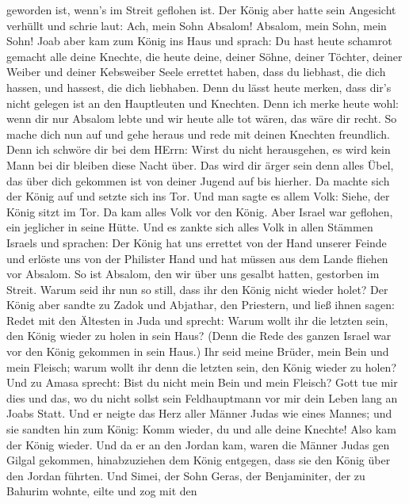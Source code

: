 geworden ist, wenn's im Streit geflohen ist.  Der König aber
hatte sein Angesicht verhüllt und schrie laut: Ach, mein Sohn Absalom!
Absalom, mein Sohn, mein Sohn!  Joab aber kam zum König ins
Haus und sprach: Du hast heute schamrot gemacht alle deine Knechte, die
heute deine, deiner Söhne, deiner Töchter, deiner Weiber und deiner
Kebsweiber Seele errettet haben,  dass du liebhast, die dich
hassen, und hassest, die dich liebhaben. Denn du lässt heute merken,
dass dir's nicht gelegen ist an den Hauptleuten und Knechten. Denn ich
merke heute wohl: wenn dir nur Absalom lebte und wir heute alle tot
wären, das wäre dir recht.  So mache dich nun auf und gehe
heraus und rede mit deinen Knechten freundlich. Denn ich schwöre dir bei
dem HErrn: Wirst du nicht herausgehen, es wird kein Mann bei dir bleiben
diese Nacht über. Das wird dir ärger sein denn alles Übel, das über dich
gekommen ist von deiner Jugend auf bis hierher.  Da machte
sich der König auf und setzte sich ins Tor. Und man sagte es allem Volk:
Siehe, der König sitzt im Tor. Da kam alles Volk vor den König. Aber
Israel war geflohen, ein jeglicher in seine Hütte.  Und es
zankte sich alles Volk in allen Stämmen Israels und sprachen: Der König
hat uns errettet von der Hand unserer Feinde und erlöste uns von der
Philister Hand und hat müssen aus dem Lande fliehen vor Absalom.
 So ist Absalom, den wir über uns gesalbt hatten, gestorben
im Streit. Warum seid ihr nun so still, dass ihr den König nicht wieder
holet?  Der König aber sandte zu Zadok und Abjathar, den
Priestern, und ließ ihnen sagen: Redet mit den Ältesten in Juda und
sprecht: Warum wollt ihr die letzten sein, den König wieder zu holen in
sein Haus? (Denn die Rede des ganzen Israel war vor den König gekommen
in sein Haus.)  Ihr seid meine Brüder, mein Bein und mein
Fleisch; warum wollt ihr denn die letzten sein, den König wieder zu
holen?  Und zu Amasa sprecht: Bist du nicht mein Bein und
mein Fleisch? Gott tue mir dies und das, wo du nicht sollst sein
Feldhauptmann vor mir dein Leben lang an Joabs Statt.  Und
er neigte das Herz aller Männer Judas wie eines Mannes; und sie sandten
hin zum König: Komm wieder, du und alle deine Knechte! 
Also kam der König wieder. Und da er an den Jordan kam, waren die Männer
Judas gen Gilgal gekommen, hinabzuziehen dem König entgegen, dass sie
den König über den Jordan führten.  Und Simei, der Sohn
Geras, der Benjaminiter, der zu Bahurim wohnte, eilte und zog mit den
